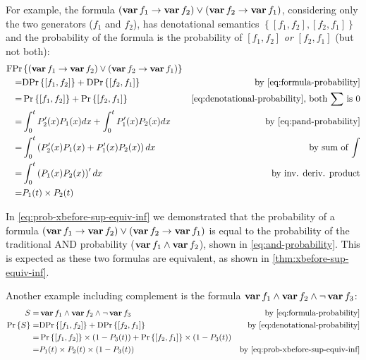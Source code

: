 \documentclass[12pt,openright,twoside,a4paper,oldfontcommands,english,brazil,final]{abntex2}
\theoremstyle{theo}
\def\varop{\ensuremath\operatorname{\mathbf{var}}}
\newcommand{\var}[1]{\ensuremath\varop #1}
\def\xbeforeop{\ensuremath\rightarrow}
\newcommand{\xbefore}[2]{\ensuremath #1 \xbeforeop #2 }
\def\probabilityop{\ensuremath \Pr}
\newcommand{\probability}[1]{\ensuremath \probabilityop\left\{#1\right\}}
\def\denotationalprobop{\ensuremath\mathrm{DPr}}
\newcommand{\denotationalprob}[1]{\ensuremath \denotationalprobop\left\{#1\right\}}
\def\formulaprobop{\ensuremath\mathrm{FPr}}
\begin{document}
For example, the formula $\left(\xbefore{\var{f_1}}{\var{f_2}}\right) \lor \left(\xbefore{\var{f_2}}{\var{f_1}}\right)$, considering only the two generators ($f_1$ and $f_2$), has denotational semantics $\left\{\left[f_1, f_2\right], \left[f_2, f_1\right]\right\}$ and the probability of the formula is the probability of $\left[f_1, f_2\right]$ \emph{or} $\left[f_2, f_1\right]$ (but not both):
%
\begin{align}
\formulaprobop&\left\{\left(\xbefore{\var{f_1}}{\var{f_2}}\right) \lor \left(\xbefore{\var{f_2}}{\var{f_1}}\right)\right\}\nonumber\\
=&\denotationalprob{\left[f_1,f_2\right]} + \denotationalprob{\left[f_2,f_1\right]} & \text{by \cref{eq:formula-probability}} \nonumber\\
= &\probability{\left[f_1,f_2\right]} + \probability{\left[f_2,f_1\right]} & \text{\cref{eq:denotational-probability}, both $\sum$ is $0$}\nonumber\\
=&\int_0^t P'_2(x) P_1(x) dx + \int_0^t P'_1(x) P_2(x) dx & \text{by \cref{eq:pand-probability}} \nonumber\\
= & \int_0^t \left(P'_2(x) P_1(x) + P'_1(x) P_2(x)\right) dx & \text{by sum of $\int$} \nonumber\\
= & \int_0^t \left(P_1(x) P_2(x)\right)' dx & \text{by inv. deriv. product} \nonumber\\
= & P_1(t) \times P_2(t)\label{eq:prob-xbefore-sup-equiv-inf}
\end{align}

In \cref{eq:prob-xbefore-sup-equiv-inf} we demonstrated that the probability of a formula $\left(\xbefore{\var{f_1}}{\var{f_2}}\right) \lor \left(\xbefore{\var{f_2}}{\var{f_1}}\right)$ is equal to the probability of the traditional \ac{AND} probability ($\var{f_1} \land \var{f_2}$), shown in \cref{eq:and-probability}.
This is expected as these two formulas are equivalent, as shown in \cref{thm:xbefore-sup-equiv-inf}.

Another example including complement is the formula $\var{f_1} \land \var{f_2} \land \lnot \var{f_3}$:
%
\begin{align}
S = & \var{f_1} \land \var{f_2} \land \lnot \var{f_3}
  & \text{by \cref{eq:formula-probability}}\nonumber\\
\probability{S} = &
\denotationalprob{\left[f_1,f_2\right]} + \denotationalprob{\left[f_2,f_1\right]} 
  & \text{by \cref{eq:denotational-probability}}\nonumber\\
= & \probability{\left[f_1,f_2\right]}\times \left(1 - P_3(t)\right)
+ \probability{\left[f_2,f_1\right]}\times \left(1 - P_3(t)\right)\nonumber\\
= & P_1(t) \times P_2(t) \times \left(1 - P_3(t)\right) & \text{by \cref{eq:prob-xbefore-sup-equiv-inf}}
\end{align}
\end{document}
